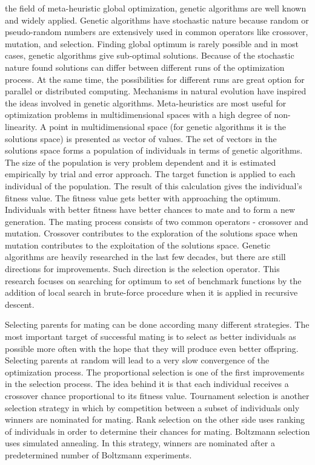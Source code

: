 \documentclass[conference]{IEEEtran}
\begin{document}
 the field of meta-heuristic global optimization, genetic algorithms are well known and widely applied. Genetic algorithms have stochastic nature because random or pseudo-random numbers are extensively used in common operators like crossover, mutation, and selection. Finding global optimum is rarely possible and in most cases, genetic algorithms give sub-optimal solutions. Because of the stochastic nature found solutions can differ between different runs of the optimization process. At the same time, the possibilities for different runs are great option for parallel or distributed computing. Mechanisms in natural evolution have inspired the ideas involved in genetic algorithms. Meta-heuristics are most useful for optimization problems in multidimensional spaces with a high degree of non-linearity. A point in multidimensional space (for genetic algorithms it is the solutions space) is presented as vector of values. The set of vectors in the solutions space forms a population of individuals in terms of genetic algorithms. The size of the population is very problem dependent and it is estimated empirically by trial and error approach. The target function is applied to each individual of the population. The result of this calculation gives the individual's fitness value. The fitness value gets better with approaching the optimum. Individuals with better fitness have better chances to mate and to form a new generation. The mating process consists of two common operators - crossover and mutation. Crossover contributes to the exploration of the solutions space when mutation contributes to the exploitation of the solutions space. Genetic algorithms are heavily researched in the last few decades, but there are still directions for improvements. Such direction is the selection operator. This research focuses on searching for optimum to set of benchmark functions by the addition of local search in brute-force procedure when it is applied in recursive descent. 

Selecting parents for mating can be done according many different strategies. The most important target of successful mating is to select as better individuals as possible more often with the hope that they will produce even better offspring. Selecting parents at random will lead to a very slow convergence of the optimization process. The proportional selection is one of the first improvements in the selection process. The idea behind it is that each individual receives a crossover chance proportional to its fitness value. Tournament selection is another selection strategy in which by competition between a subset of individuals only winners are nominated for mating. Rank selection on the other side uses ranking of individuals in order to determine their chances for mating. Boltzmann selection uses simulated annealing. In this strategy, winners are nominated after a predetermined number of Boltzmann experiments. 
\end{document}
